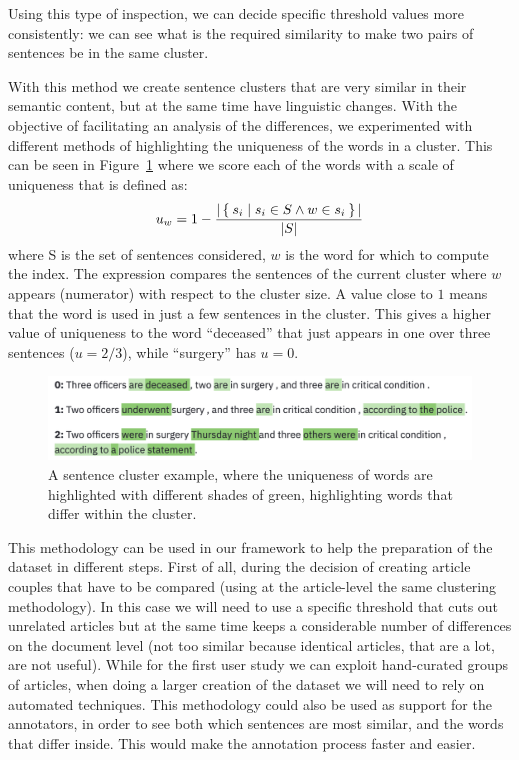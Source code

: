 Using this type of inspection, we can decide specific threshold values more consistently: we can see what is the required similarity to make two pairs of sentences be in the same cluster.

With this method we create sentence clusters that are very similar in their semantic content, but at the same time have linguistic changes.
With the objective of facilitating an analysis of the differences, we experimented with different methods of highlighting the uniqueness of the words in a cluster.
This can be seen in Figure~\ref{fig:words_uniqueness} where we score each of the words with a scale of uniqueness that is defined as:
$$u_w = 1 - \frac{|\Set{s_i | s_i \in S \land w \in s_i}|}{|S|}$$
where S is the set of sentences considered, $w$ is the word for which to compute the index. The expression compares the sentences of the current cluster where $w$ appears (numerator) with respect to the cluster size.
A value close to $1$ means that the word is used in just a few sentences in the cluster.
This gives a higher value of uniqueness to the word ``deceased'' that just appears in one over three sentences ($u = 2/3$), while ``surgery'' has $u = 0$.

\begin{figure}[!htb]
    \centering
    \includegraphics[width=\textwidth]{figures/words_uniqueness.png}
    \caption{A sentence cluster example, where the uniqueness of words are highlighted with different shades of green, highlighting words that differ within the cluster.}
    \label{fig:words_uniqueness}
\end{figure}



This methodology can be used in our framework to help the preparation of the dataset in different steps.
First of all, during the decision of creating article couples that have to be compared (using at the article-level the same clustering methodology). In this case we will need to use a specific threshold that cuts out unrelated articles but at the same time keeps a considerable number of differences on the document level (not too similar because identical articles, that are a lot, are not useful).
While for the first user study we can exploit hand-curated groups of articles, when doing a larger creation of the dataset we will need to rely on automated techniques.
This methodology could also be used as support for the annotators, in order to see both which sentences are most similar, and the words that differ inside. This would make the annotation process faster and easier.

